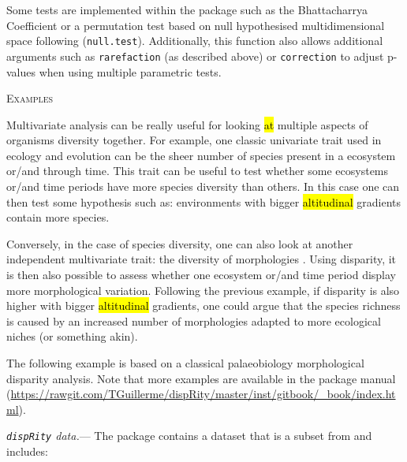 \documentclass[12pt,letterpaper]{article}
\renewcommand{\section}[1]{%
\bigskip
\begin{center}
\begin{Large}
\normalfont\scshape #1
\medskip
\end{Large}
\end{center}}
\renewcommand{\subsubsection}[1]{%
\vspace{2ex}
\noindent
\textit{#1.}---}
\newcommand{\disp}{\texttt{dispRity} }
\begin{document}
Some tests are implemented within the package such as the Bhattacharrya Coefficient \citep[\texttt{bhatt.coeff};][]{Bhattacharyya,GuillermeCooper} or a permutation test based on null hypothesised multidimensional space following \cite{diaz2016global} (\texttt{null.test}).
Additionally, this function also allows additional arguments such as \texttt{rarefaction} (as described above) or \texttt{correction} to adjust p-values when using multiple parametric tests.

\section{Examples}
Multivariate analysis can be really useful for looking \hl{at} multiple aspects of organisms diversity together.
For example, one classic univariate trait used in ecology and evolution can be the sheer number of species present in a ecosystem or/and through time.
This trait can be useful to test whether some ecosystems or/and time periods have more species diversity than others.
In this case one can then test some hypothesis such as: environments with bigger \hl{altitudinal} gradients contain more species.

Conversely, in the case of species diversity, one can also look at another independent multivariate trait: the diversity of morphologies \citep[or disparity;][]{ruta2013}.
Using disparity, it is then also possible to assess whether one ecosystem or/and time period display more morphological variation.
Following the previous example, if disparity is also higher with bigger \hl{altitudinal} gradients, one could argue that the species richness is caused by an increased number of morphologies adapted to more ecological niches (or something akin).

The following example is based on a classical palaeobiology morphological disparity analysis.
Note that more examples are available in the package manual (\url{https://rawgit.com/TGuillerme/dispRity/master/inst/gitbook/_book/index.html}).

\subsubsection{\disp data}
The package contains a dataset that is a subset from \cite{beckancient2014} and includes:
\end{document}
